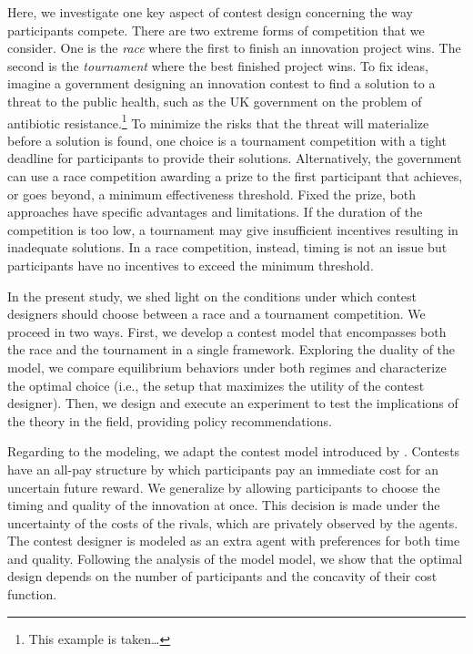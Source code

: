 \documentclass[12pt,]{article}
\theoremstyle{plain} %
\begin{document}
Here, we investigate one key aspect of contest design concerning the way
participants compete. There are two extreme forms of competition that we
consider. One is the \emph{race} where the first to finish an innovation
project wins. The second is the \emph{tournament} where the best
finished project wins. To fix ideas, imagine a government designing an
innovation contest to find a solution to a threat to the public health,
such as the UK government on the problem of antibiotic
resistance.\footnote{This example is taken\ldots{}} To minimize the
risks that the threat will materialize before a solution is found, one
choice is a tournament competition with a tight deadline for
participants to provide their solutions. Alternatively, the government
can use a race competition awarding a prize to the first participant
that achieves, or goes beyond, a minimum effectiveness threshold. Fixed
the prize, both approaches have specific advantages and limitations. If
the duration of the competition is too low, a tournament may give
insufficient incentives resulting in inadequate solutions. In a race
competition, instead, timing is not an issue but participants have no
incentives to exceed the minimum threshold.

In the present study, we shed light on the conditions under which
contest designers should choose between a race and a tournament
competition. We proceed in two ways. First, we develop a contest model
that encompasses both the race and the tournament in a single framework.
Exploring the duality of the model, we compare equilibrium behaviors
under both regimes and characterize the optimal choice (i.e., the setup
that maximizes the utility of the contest designer). Then, we design and
execute an experiment to test the implications of the theory in the
field, providing policy recommendations.

Regarding to the modeling, we adapt the contest model introduced by
\citet{moldovanu2001optimal}. Contests have an all-pay structure by
which participants pay an immediate cost for an uncertain future reward.
We generalize by allowing participants to choose the timing and quality
of the innovation at once. This decision is made under the uncertainty
of the costs of the rivals, which are privately observed by the agents.
The contest designer is modeled as an extra agent with preferences for
both time and quality. Following the analysis of the model model, we
show that the optimal design depends on the number of participants and
the concavity of their cost function.
\end{document}
